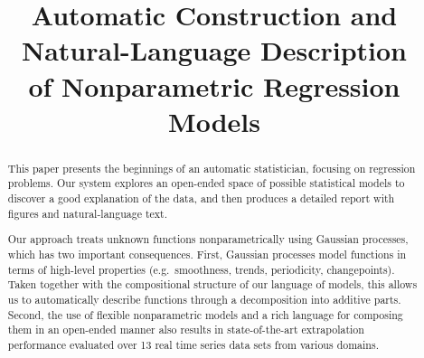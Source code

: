 \documentclass[letterpaper]{article}
\begin{document}
%
\title{Automatic Construction and Natural-Language Description \\ of Nonparametric Regression Models}
\author{}
\maketitle






\begin{abstract} 
This paper presents the beginnings of an automatic statistician, focusing on regression problems.
Our system explores an open-ended space of possible statistical models to discover a good explanation of the data, and then produces a detailed report with figures and natural-language text.

Our approach treats unknown functions nonparametrically using Gaussian processes, which has two important consequences.
First, Gaussian processes model functions in terms of high-level properties (e.g.\ smoothness, trends, periodicity,
changepoints).
Taken together with the compositional structure of our language of models, this allows us to automatically describe functions through a decomposition into additive parts.
Second, the use of flexible nonparametric models and a rich
language for composing them in an open-ended manner also results
in state-of-the-art extrapolation performance evaluated over 13 real time
series data sets from various domains.

\end{abstract} 
\end{document}
